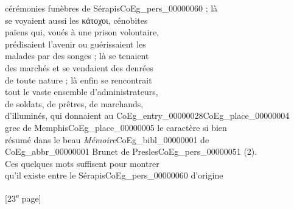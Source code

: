 \documentclass{book}
\begin{document}
{\begin{paracol}{2}
cérémonies funèbres de Sérapis\gls{CoEg_pers_00000060} ; là\\
se voyaient aussi les κάτοχοι, cénobites\\
païens qui, voués à une prison volontaire,\\
prédisaient l’avenir ou guérissaient les\\
malades par des songes ; là se tenaient\\
des marchés et se vendaient des denrées\\
de toute nature ; là enfin se rencontrait\\
tout le vaste ensemble d’administrateurs,\\
de soldats, de prêtres, de marchands,\\
d’illuminés, qui donnaient au \Gls{CoEg_entry_00000028}\gls{CoEg_place_00000004}\\
grec de Memphis\gls{CoEg_place_00000005} le caractère si bien\\
résumé dans le beau \textit{Mémoire}\gls{CoEg_bibl_00000001} de\\
\gls{CoEg_abbr_00000001} Brunet de Presles\gls{CoEg_pers_00000051} (2).\\
\indent Ces quelques mots suffisent pour montrer\\
qu’il existe entre le Sérapis\gls{CoEg_pers_00000060} d’origine
\end{paracol}

{\footnotesize\begin{center} {[23\textsuperscript{e} page]}\end{center}}

}
\end{document}
